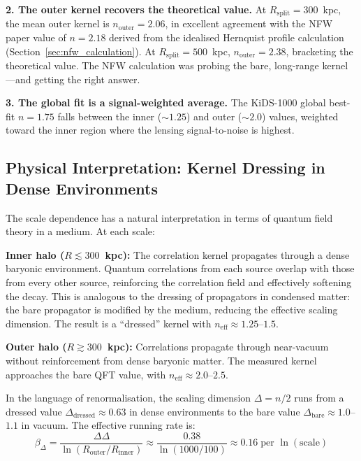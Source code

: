 \documentclass[12pt,a4paper]{article}
\begin{document}
\textbf{2. The outer kernel recovers the theoretical value.} At $R_{\mathrm{split}} = 300$~kpc, the mean outer kernel is $n_{\mathrm{outer}} = 2.06$, in excellent agreement with the NFW paper value of $n = 2.18$ derived from the idealised Hernquist profile calculation (Section~\ref{sec:nfw_calculation}). At $R_{\mathrm{split}} = 500$~kpc, $n_{\mathrm{outer}} = 2.38$, bracketing the theoretical value. The NFW calculation was probing the bare, long-range kernel---and getting the right answer.

\textbf{3. The global fit is a signal-weighted average.} The KiDS-1000 global best-fit $n = 1.75$ falls between the inner ($\sim 1.25$) and outer ($\sim 2.0$) values, weighted toward the inner region where the lensing signal-to-noise is highest.

\subsection{Physical Interpretation: Kernel Dressing in Dense Environments}

The scale dependence has a natural interpretation in terms of quantum field theory in a medium. At each scale:

\textbf{Inner halo ($R \lesssim 300$~kpc):} The correlation kernel propagates through a dense baryonic environment. Quantum correlations from each source overlap with those from every other source, reinforcing the correlation field and effectively softening the decay. This is analogous to the dressing of propagators in condensed matter: the bare propagator is modified by the medium, reducing the effective scaling dimension. The result is a ``dressed'' kernel with $n_{\mathrm{eff}} \approx 1.25$--$1.5$.

\textbf{Outer halo ($R \gtrsim 300$~kpc):} Correlations propagate through near-vacuum without reinforcement from dense baryonic matter. The measured kernel approaches the bare QFT value, with $n_{\mathrm{eff}} \approx 2.0$--$2.5$.

In the language of renormalisation, the scaling dimension $\Delta = n/2$ runs from a dressed value $\Delta_{\mathrm{dressed}} \approx 0.63$ in dense environments to the bare value $\Delta_{\mathrm{bare}} \approx 1.0$--$1.1$ in vacuum. The effective running rate is:
\begin{equation}
    \beta_\Delta = \frac{\Delta\Delta}{\ln(R_{\mathrm{outer}} / R_{\mathrm{inner}})} \approx \frac{0.38}{\ln(1000/100)} \approx 0.16 \; \text{per } \ln(\text{scale})
    \label{eq:running}
\end{equation}
\end{document}
